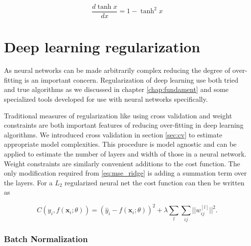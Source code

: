 \begin{equation}
\frac{d \tanh x}{d x}  = 1-\tanh^2 x
\end{equation}

\noindent 

\section{Deep learning regularization}

As neural networks can be made arbitrarily complex reducing the degree of over-fitting is an important concern. Regularization of deep learning use both tried and true algorithms as we discussed in chapter \ref{chap:fundament} and some specialized tools developed for use with neural networks specifically. 

Traditional measures of regularization like using cross validation and weight constraints are both important features of reducing over-fitting in deep learning algorithms. We introduced cross validation in section \ref{sec:cv} to estimate appropriate model complexities. This procedure is model agnostic and can be applied to estimate the number of layers and width of those in a neural network. Weight constraints are similarly convenient additions to the cost function. The only modification required from \ref{eq:mse_ridge} is adding a summation term over the layers. For a $L_2$ regularized neural net the cost function can then be written as 

\begin{equation}
C(\hat{y}_i, f(\mathbf{x}_i; \theta)) = (\hat{y}_i - f(\mathbf{x}_i; \theta))^2 + \lambda\sum_l\sum_{ij}||w_{ij}^{[l]}||^2.
\end{equation}



\subsubsection{Batch Normalization}\label{sec:batchnorm}
